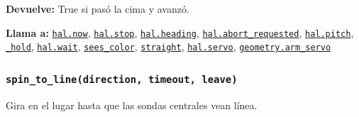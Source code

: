 \par{}\par\smallskip
\noindent\textbf{Devuelve:} True si pasó la cima y avanzó.\par
\noindent\textbf{Llama a:} \hyperref[fn:hal:now]{\texttt{hal.now}}, \hyperref[fn:hal:stop]{\texttt{hal.stop}}, \hyperref[fn:hal:heading]{\texttt{hal.heading}}, \hyperref[fn:hal:abort-requested]{\texttt{hal.abort\_\allowbreak{}requested}}, \hyperref[fn:hal:pitch]{\texttt{hal.pitch}}, \hyperref[fn:motion:-hold]{\texttt{\_\allowbreak{}hold}}, \hyperref[fn:hal:wait]{\texttt{hal.wait}}, \hyperref[fn:motion:sees-color]{\texttt{sees\_\allowbreak{}color}}, \hyperref[fn:motion:straight]{\texttt{straight}}, \hyperref[fn:hal:servo]{\texttt{hal.servo}}, \hyperref[fn:geometry:arm-servo]{\texttt{geometry.arm\_\allowbreak{}servo}}\par

\subsubsection{\texttt{spin\_\allowbreak{}to\_\allowbreak{}line(direction, timeout, leave)}}\label{fn:motion:spin-to-line}
\noindent Gira en el lugar hasta que las sondas centrales vean línea.

